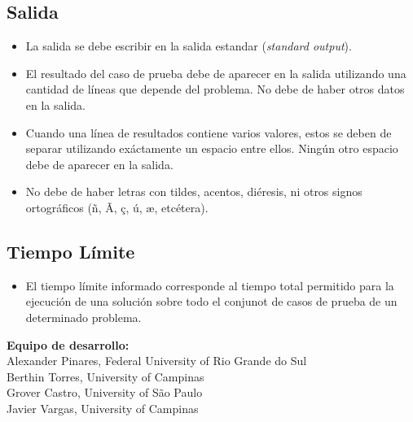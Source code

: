 \documentclass[12pt,oneside,a4paper]{book}
\theoremstyle{definition}
\begin{document}
\subsection*{Salida}
\begin{itemize}
  \item La salida se debe escribir en la salida estandar (\textit{standard output}).
  \item El resultado del caso de prueba debe de aparecer en la salida utilizando una cantidad de líneas que depende del problema. No debe de haber otros datos en la salida.
  \item Cuando una línea de resultados contiene varios valores, estos se deben de separar utilizando exáctamente un espacio entre ellos. Ningún otro espacio debe de aparecer en la salida.
  \item No debe de haber letras con tildes, acentos, diéresis, ni otros signos ortográficos (ñ, \~A, ç, ú, æ, etcétera).
\end{itemize}

\subsection*{Tiempo Límite}
\begin{itemize}
  \item El tiempo límite informado corresponde al tiempo total permitido para la ejecución de una solución sobre todo el conjunot de casos de prueba de un determinado problema.
\end{itemize}

\vfill
\begin{center}
\textbf{Equipo de desarrollo:}\\
Alexander Pinares, Federal University of Rio Grande do Sul\\
Berthin Torres, University of Campinas\\
Grover Castro, University of São Paulo\\
Javier Vargas, University of Campinas
\end{center}
\end{document}
